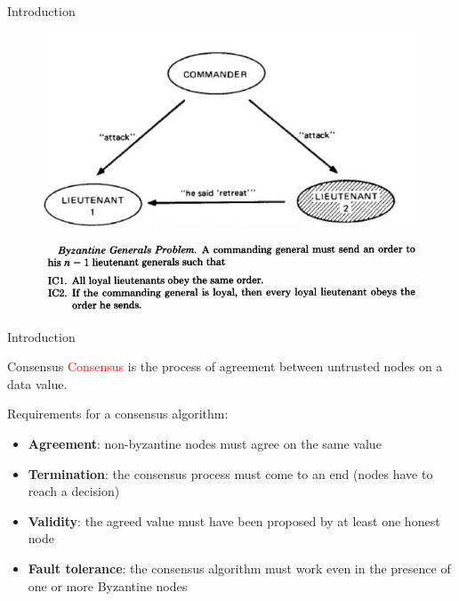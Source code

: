\documentclass{beamer}
\newcommand\red[1]{\textcolor{red}{#1}}
\begin{document}
    \begin{frame}{Introduction}
        \begin{figure}[!htb]
                \centering
                \includegraphics[width=0.5\linewidth]{../img/byzantine.jpg}
        \end{figure}
        \begin{figure}
            \centering
            \includegraphics[width=0.7\linewidth]{../img/byzantine-generals-problem.png}
        \end{figure}
    \end{frame}




  \begin{frame}{Introduction}
    \begin{block}{Consensus}
      \red{Consensus} is the process of agreement between untrusted nodes on a data
      value.
    \end{block}

    \pause
    Requirements for a consensus algorithm:
    \begin{itemize}
      \item \textbf{Agreement}: non-byzantine nodes must agree on the same value
      \item \textbf{Termination}: the consensus process must come to an end (nodes
      have to reach a decision)
      \item \textbf{Validity}: the agreed value must have been proposed by at
      least one honest node
      \item \textbf{Fault tolerance}: the consensus algorithm must work even
      in the presence of one or more Byzantine nodes
    \end{itemize}
  \end{frame}

  
  
  
\end{document}
